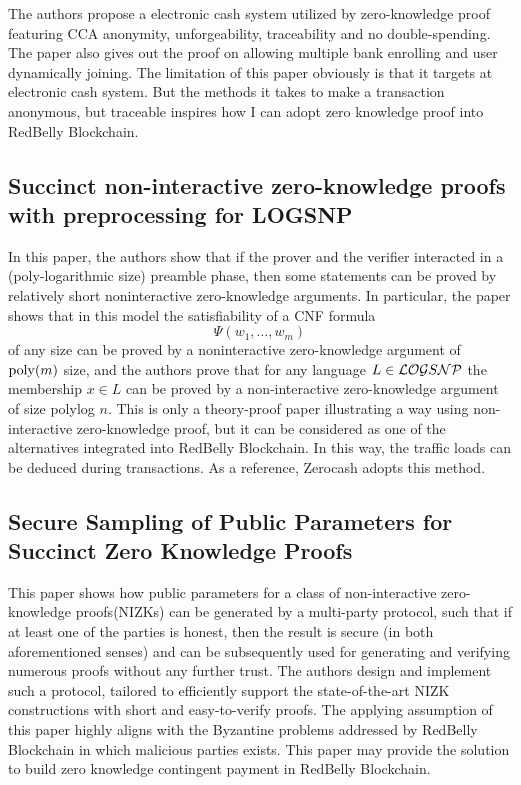 The authors propose a electronic cash system utilized by zero-knowledge proof featuring CCA anonymity, 
unforgeability, traceability and no double-spending. The paper also gives out the proof on allowing multiple
bank enrolling and user dynamically joining. The limitation of this paper obviously is that it targets at 
electronic cash system. But the methods it takes to make a transaction anonymous, but traceable inspires how
I can adopt zero knowledge proof into RedBelly Blockchain.

\subsection{Succinct non-interactive zero-knowledge proofs with preprocessing for LOGSNP\cite{kalai2006succinct}}

In this paper, the authors show that if the prover and the verifier interacted in a (poly-logarithmic size) 
preamble phase, then some statements can be proved by relatively short noninteractive 
zero-knowledge arguments. In particular, the paper shows that in this model the satisfiability of a CNF 
formula $$\Psi(w_{1}, \ldots, w_{m})$$ of any size can be proved by a noninteractive zero-knowledge 
argument of ${\rm poly}(m)$ size, and the authors prove that for any language $L\in {\cal LOG}S{\cal NP}$
the membership $x\in L$ can be proved by a non-interactive zero-knowledge argument of size polylog $n$.
This is only a theory-proof paper illustrating a way using non-interactive zero-knowledge proof, but it can
be considered as one of the alternatives integrated into RedBelly Blockchain. In this way, the traffic loads
can be deduced during transactions. As a reference, Zerocash adopts this method.

\subsection{Secure Sampling of Public Parameters for Succinct Zero Knowledge Proofs\cite{ben2015secure}}

This paper shows how public parameters for a class of non-interactive zero-knowledge proofs(NIZKs)
can be generated by a multi-party protocol, such that if at least one of the parties is honest, 
then the result is secure (in both aforementioned senses) and can be subsequently used for 
generating and verifying numerous proofs without any further trust. The authors design and implement 
such a protocol, tailored to efficiently support the state-of-the-art NIZK constructions with 
short and easy-to-verify proofs. The applying assumption of this paper highly aligns with the Byzantine
problems addressed by RedBelly Blockchain in which malicious parties exists. This paper may provide the 
solution to build zero knowledge contingent payment in RedBelly Blockchain.

